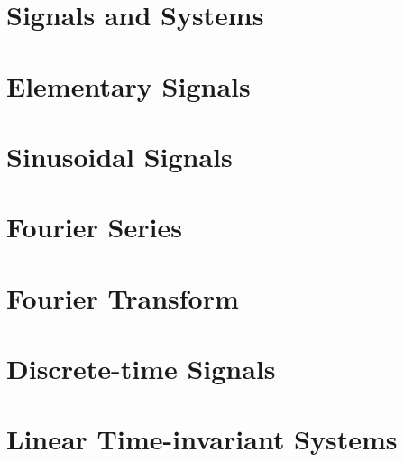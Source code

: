 \documentclass{tufte-book}
\begin{document}
\ifSpSigSys
\chapter{Signals and Systems}



\fi

\ifSpElSig
\chapter{Elementary Signals}



\fi

\ifSpSin
\chapter{Sinusoidal Signals}



\fi

\ifSpFourierSer
\chapter{Fourier Series}



\fi

\ifSpFourierTra
\chapter{Fourier Transform}



\fi

\ifSpDT
\chapter{Discrete-time Signals}



\fi

\ifSpLTI
\chapter{Linear Time-invariant Systems}



\fi



\end{document}
